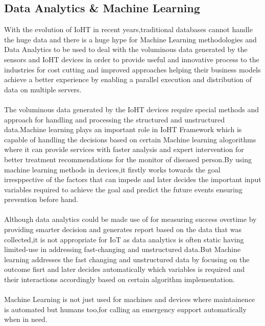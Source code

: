 \subsection{Data Analytics \& Machine Learning}
With the evolution of IoHT in recent years,traditional databases cannot handle the huge data and there is a huge hype for Machine Learning methodologies and Data Analytics to be used to deal with the voluminous data generated by the sensors and IoHT devices in order to provide useful and innovative process to the industries for cost cutting and improved approaches helping their business models achieve a better experience by enabling a parallel execution and distribution of data on multiple servers.\\ \\
The voluminous data generated by the IoHT devices require special methods and approach for handling and processing the structured and unstructured data.Machine learning plays an important role in IoHT Framework which is capable of handling the decisions based on certain Machine learning alogorithms where it can provide services with faster analysis and expert intervention for better treatment recommendations for the monitor of diseased person.By using machine learning methods in devices,it firstly works towards the goal irresppective of the factors that can impede and later decides the important input variables required to achieve the goal and predict the future events ensuring prevention before hand.\cite{syed2019data}\\ \\
Although data analytics could be made use of for measuring success overtime by providing smarter decision and generates report based on the data that was collected,it is not appropriate for IoT as data analytics is often static having limited-use in addressing fast-changing and unstructured data.\cite{calum}But Machine learning addresses the fast changing and unstructured data by focusing on the outcome fisrt and later decides automatically which variables is required and their interactions accordingly based on certain algorithm implementation.\\ \\
Machine Learning is not just used for machines and devices where maintainence is automated but humans too,for calling an emergency support automatically when in need.\\ \\


